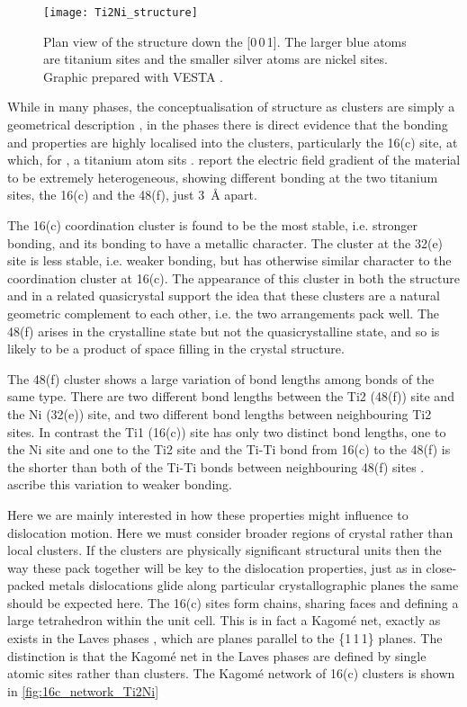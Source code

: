\begin{figure}
\centering
\texttt{[image: Ti2Ni\_structure]}
\captionsetup{width=0.6\textwidth}
\caption[Plan view of the  structure.]{Plan view of the  structure down the [0\,0\,1]. The larger blue atoms are titanium sites and the smaller silver atoms are nickel sites. Graphic prepared with VESTA \cite{Momma2011}.\label{fig:Ti2Ni_plan}}
\end{figure}



While in many phases, the conceptualisation of structure as clusters are simply a geometrical description \cite{Steurer2006}, in the  phases there is direct evidence that the bonding and properties are highly localised into the clusters, particularly the 16(c) site, at which, for , a titanium atom sits \cite{Ivanovic2006}. \citet{Ivanovic2006} report the electric field gradient of the material to be extremely heterogeneous, showing different bonding at the two titanium sites, the 16(c) and the 48(f), just \SI{3}{\angstrom} apart. 

The 16(c) coordination cluster is found to be the most stable, i.e. stronger bonding, and its bonding to have a metallic character. The cluster at the 32(e) site is less stable, i.e. weaker bonding, but has otherwise similar character to the coordination cluster at 16(c). The appearance of this cluster in both the  structure and in a related quasicrystal support the idea that these clusters are a natural geometric complement to each other, i.e. the two arrangements pack well. The 48(f) arises in the crystalline state but not the quasicrystalline state, and so is likely to be a product of space filling in the  crystal structure. 

The 48(f) cluster shows a large variation of bond lengths among bonds of the same type. There are two different bond lengths between the  Ti2 (48(f)) site and the Ni (32(e)) site, and two different bond lengths between neighbouring Ti2 sites. In contrast the Ti1 (16(c)) site has only two distinct bond lengths, one to the Ni site and one to the Ti2 site and the Ti-Ti bond from 16(c) to the 48(f) is the shorter than both of the Ti-Ti bonds between neighbouring 48(f) sites \cite{Yurko1959,Yurko1962,Ivanovic2006}.  \citet{Ivanovic2006} ascribe this variation to weaker bonding.


Here we are mainly interested in how these properties might influence to dislocation motion. Here we must consider broader regions of crystal rather than local clusters. If the clusters are physically significant structural units then the way these pack together will be key to the dislocation properties, just as in close-packed metals dislocations glide along particular crystallographic planes the same should be expected here. The 16(c) sites form chains, sharing faces and defining a large tetrahedron within the unit cell. This is in fact a Kagom\'{e} net, exactly as exists in the Laves phases \cite{Stein2004,Stein2005}, which are planes parallel to the \{1\,1\,1\} planes. The distinction is that the Kagom\'{e} net in the Laves phases are defined by single atomic sites rather than clusters. The Kagom\'{e} network of 16(c) clusters is shown in \autoref{fig:16c_network_Ti2Ni}

